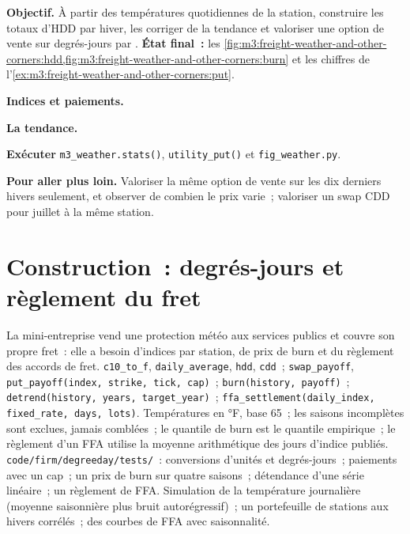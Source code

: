 \begin{tutorial}
\textbf{Objectif.} À partir des températures quotidiennes de la station, construire les totaux d'HDD par hiver, les corriger de la tendance et valoriser une
option de vente sur degrés-jours par . \textbf{État final~:}
les \cref{fig:m3:freight-weather-and-other-corners:hdd,fig:m3:freight-weather-and-other-corners:burn} et les
chiffres de l'\cref{ex:m3:freight-weather-and-other-corners:put}.
\begin{tutsteps}
\item \textbf{Indices et paiements.}
\label{lst:m3:freight-weather-and-other-corners:burn}
\item \textbf{La tendance.}
\label{lst:m3:freight-weather-and-other-corners:detrend}
\item \textbf{Exécuter} \texttt{m3\_weather.stats()}, \texttt{utility\_put()} et \texttt{fig\_weather.py}.
\end{tutsteps}
\textbf{Pour aller plus loin.} Valoriser la même option de vente sur les dix derniers hivers seulement, et observer de combien le prix
varie~; valoriser un swap CDD pour juillet à la même station.
\end{tutorial}

\section{Construction~: degrés-jours et règlement du fret}\label{bld:m3:freight-weather-and-other-corners:degreeday}

\begin{build}
 La mini-entreprise vend une protection météo aux services publics et couvre son propre fret~:
elle a besoin d'indices par station, de prix de burn et du règlement des accords de fret.
 \texttt{c10\_to\_f}, \texttt{daily\_average}, \texttt{hdd}, \texttt{cdd}~;
\texttt{swap\_payoff}, \texttt{put\_payoff(index, strike, tick, cap)}~; \texttt{burn(history, payoff)}~;
\texttt{detrend(history, years, target\_year)}~; \texttt{ffa\_settlement(daily\_index, fixed\_rate, days,
lots)}.
 Températures en °F, base 65~; les saisons incomplètes sont exclues, jamais comblées~; le quantile
de burn est le quantile empirique~; le règlement d'un FFA utilise la moyenne arithmétique des jours d'indice publiés.
 \texttt{code/firm/degreeday/tests/}~: conversions d'unités et degrés-jours~; paiements
avec un cap~; un prix de burn sur quatre saisons~; détendance d'une série linéaire~; un règlement de FFA.
 Simulation de la température journalière (moyenne saisonnière plus bruit autorégressif)~; un portefeuille
de stations aux hivers corrélés~; des courbes de FFA avec saisonnalité.
\end{build}

